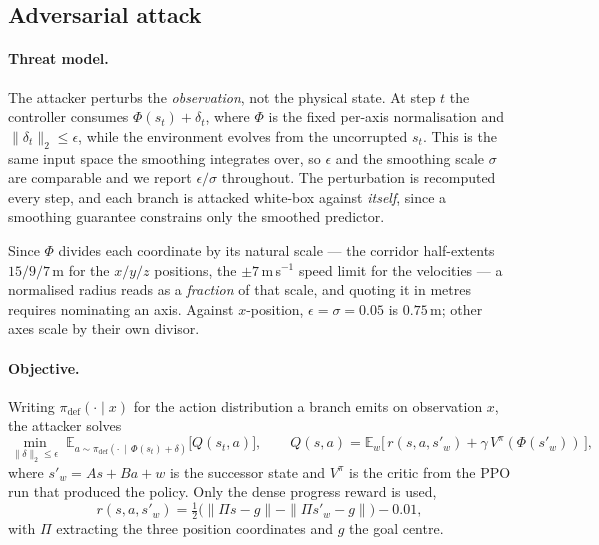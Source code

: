 
\subsection{Adversarial attack}
\label{sec:uav3d-attack}

\paragraph{Threat model.} The attacker perturbs the \emph{observation}, not the
physical state. At step $t$ the controller consumes $\Phi(s_t) + \delta_t$, where
$\Phi$ is the fixed per-axis normalisation and $\|\delta_t\|_2 \le \epsilon$,
while the environment evolves from the uncorrupted $s_t$. This is the same input
space the smoothing integrates over, so $\epsilon$ and the smoothing scale
$\sigma$ are comparable and we report $\epsilon/\sigma$ throughout. The
perturbation is recomputed every step, and each branch is attacked white-box
against \emph{itself}, since a smoothing guarantee constrains only the smoothed
predictor.

Since $\Phi$ divides each coordinate by its natural scale --- the corridor
half-extents $15/9/7$\,m for the $x/y/z$ positions, the $\pm7$\,m\,s$^{-1}$ speed
limit for the velocities --- a normalised radius reads as a \emph{fraction} of
that scale, and quoting it in metres requires nominating an axis. Against
$x$-position, $\epsilon=\sigma=0.05$ is $0.75$\,m; other axes scale by their own
divisor.

\paragraph{Objective.} Writing $\pi_{\mathrm{def}}(\cdot\mid x)$ for the action
distribution a branch emits on observation $x$, the attacker solves
%
\begin{equation}
  \min_{\|\delta\|_2 \le \epsilon}\;
  \mathbb{E}_{a \sim \pi_{\mathrm{def}}(\cdot\,\mid\, \Phi(s_t) + \delta)}\bigl[Q(s_t,a)\bigr],
  \qquad
  Q(s,a) = \mathbb{E}_{w}\bigl[\, r(s,a,s'_w) + \gamma\, V^{\pi}(\Phi(s'_w)) \,\bigr],
  \label{eq:uav-attack}
\end{equation}
%
where $s'_w = As + Ba + w$ is the successor state and $V^\pi$ is the critic from
the PPO run that produced the policy. Only the dense progress reward is used,
%
\begin{equation}
  r(s,a,s'_w) = \tfrac12\bigl(\|\Pi s - g\| - \|\Pi s'_w - g\|\bigr) - 0.01,
  \label{eq:uav-reward}
\end{equation}
%
with $\Pi$ extracting the three position coordinates and $g$ the goal centre.

